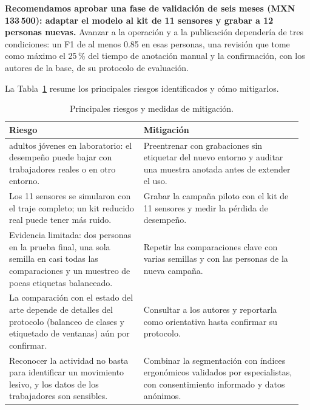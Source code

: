 \documentclass[letterpaper,11pt]{article}
\begin{document}
\textbf{Recomendamos aprobar una fase de validación de seis meses (MXN 133\,500): adaptar el modelo al kit de 11 sensores y grabar a 12 personas nuevas.} Avanzar a la operación y a la publicación dependería de tres condiciones: un F1 de al menos 0.85 en esas personas, una revisión que tome como máximo el 25\,\% del tiempo de anotación manual y la confirmación, con los autores de la base, de su protocolo de evaluación.

La Tabla~\ref{tab:riesgos} resume los principales riesgos identificados y cómo mitigarlos.

\begin{table}[!tbp]
\centering
\footnotesize{}
\caption{Principales riesgos y medidas de mitigación.}
\label{tab:riesgos}
\begin{tabular}{@{}>{\raggedright\arraybackslash}p{0.44\linewidth}@{\hspace{0.04\linewidth}}>{\raggedright\arraybackslash}p{0.52\linewidth}@{}}
\toprule
\textbf{Riesgo} & \textbf{Mitigación}\\
\midrule
14 adultos jóvenes en laboratorio: el desempeño puede bajar con trabajadores reales o en otro entorno. & Preentrenar con grabaciones sin etiquetar del nuevo entorno y auditar una muestra anotada antes de extender el uso.\\[1pt]
Los 11 sensores se simularon con el traje completo; un kit reducido real puede tener más ruido. & Grabar la campaña piloto con el kit de 11 sensores y medir la pérdida de desempeño.\\[1pt]
Evidencia limitada: dos personas en la prueba final, una sola semilla en casi todas las comparaciones y un muestreo de pocas etiquetas balanceado. & Repetir las comparaciones clave con varias semillas y con las personas de la nueva campaña.\\[1pt]
La comparación con el estado del arte depende de detalles del protocolo (balanceo de clases y etiquetado de ventanas) aún por confirmar. & Consultar a los autores y reportarla como orientativa hasta confirmar su protocolo.\\[1pt]
Reconocer la actividad no basta para identificar un movimiento lesivo, y los datos de los trabajadores son sensibles. & Combinar la segmentación con índices ergonómicos validados por especialistas, con consentimiento informado y datos anónimos.\\
\bottomrule
\end{tabular}
\end{table}
\end{document}
